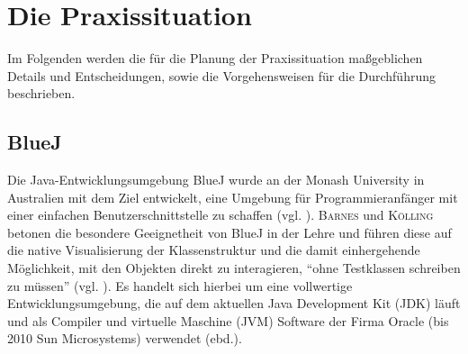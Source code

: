\documentclass[paper=a4, DIV=13, BCOR=8mm, oneside=on, onecolumn=on, open = any, titlepage =on, parskip =half-, headsepline = on, footsepline = off, chapterprefix = on, sectionprefix = on, appendixprefix = off, fontsize = 12pt, numbers = noenddot, abstract = off]{scrreprt}
\begin{document}
\chapter{Die Praxissituation}
\onehalfspacing
\vspace*{-1cm}
 Im Folgenden werden die für die Planung der Praxissituation maßgeblichen Details und Entscheidungen, sowie die Vorgehensweisen für die Durchführung beschrieben. 
\par \singlespacing
 \section{BlueJ}
\onehalfspacing
\label{sec:bluej}
Die Java-Entwicklungsumgebung BlueJ wurde an der Monash University in Australien mit dem Ziel entwickelt, eine Umgebung für Programmieranfänger mit einer einfachen Benutzerschnittstelle zu schaffen (vgl. \cite[S.14]{barnes:03}). \textsc{Barnes} und \textsc{Kölling} betonen die besondere Geeignetheit von BlueJ in der Lehre und führen diese auf die native Visualisierung der Klassenstruktur und die damit einhergehende Möglichkeit, mit den Objekten direkt zu interagieren, "`ohne Testklassen schreiben zu müssen"' (vgl. \cite[S.15]{barnes:03}). Es handelt sich hierbei um eine vollwertige Entwicklungsumgebung, die auf dem aktuellen Java Development Kit (JDK) läuft und als Compiler und virtuelle Maschine (JVM) Software der Firma Oracle (bis 2010 Sun Microsystems) verwendet (ebd.).


\end{document}
